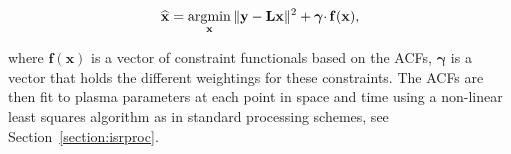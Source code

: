 \begin{equation}
\label{eqn:lstsqrsvecdb}
\widehat{\mathbf{x}} = \operatorname*{\arg\!\min}\limits_{\mathbf{x}} \|\mathbf{y} -\mathbf{Lx} \|^2 + \boldsymbol{\gamma}\cdotp\mathbf{f}(\mathbf{x}),
\end{equation}

\noindent where $\mathbf{f}(\mathbf{x})$ is a vector of constraint functionals based on the ACFs, $\boldsymbol{\gamma}$ is a vector that holds the different weightings for these constraints. The ACFs are then fit to plasma parameters at each point in space and time using a non-linear least squares algorithm as in standard processing schemes, see Section~\ref{section:isrproc}.

%
%
%
%
%
%




%

